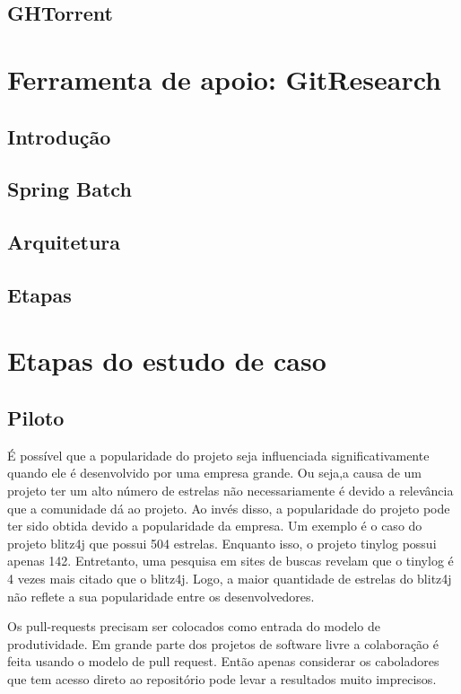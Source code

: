\subsection{GHTorrent}

\section{Ferramenta de apoio: GitResearch}
\label{cap_estudo_caso_ferramenta}

\subsection{Introdução}
\subsection{Spring Batch}
\subsection{Arquitetura}
\subsection{Etapas}



\section{Etapas do estudo de caso}

\subsection{Piloto}


É possível que a popularidade do projeto seja influenciada significativamente quando ele é desenvolvido por uma empresa grande. Ou seja,a causa de um projeto ter um alto número de estrelas não necessariamente é devido a relevância que a comunidade dá ao projeto. Ao invés disso, a popularidade do projeto pode ter sido obtida devido a popularidade da empresa. Um exemplo é o caso do projeto blitz4j que possui 504 estrelas. Enquanto isso, o projeto tinylog possui apenas 142. Entretanto, uma pesquisa em sites de buscas revelam que o tinylog é 4 vezes mais citado que o blitz4j. Logo, a maior quantidade de estrelas do blitz4j não reflete a sua popularidade entre os desenvolvedores.

Os pull-requests precisam ser colocados como entrada do modelo de produtividade. Em grande parte dos projetos de software livre a colaboração é feita usando o modelo de pull request. Então apenas considerar os caboladores que tem acesso direto ao repositório pode levar a resultados muito imprecisos.


